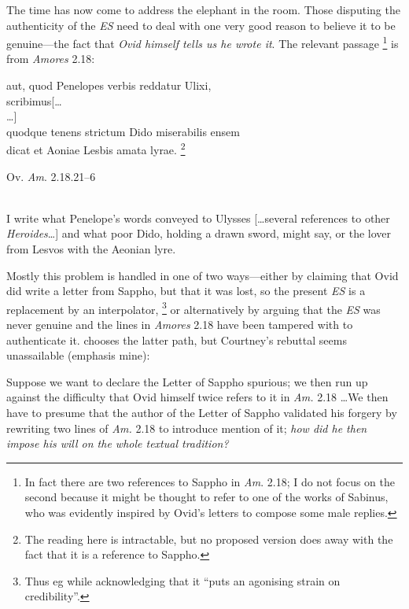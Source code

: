 \documentclass[twocolumn, switch, a4paper]{article} %
\begin{document}
The time has now come to address the elephant in the room. Those disputing the
authenticity of the \emph{ES} need to deal with one very good reason to
believe it to be genuine---the fact that \emph{Ovid himself tells us he wrote
it}. The relevant passage%
%
    \footnote{In fact there are two references to Sappho in \emph{Am}. 2.18; I
    do not focus on the second because it might be thought to refer to one of
    the works of Sabinus, who was evidently inspired by Ovid's letters to
    compose some male replies.}
%
is from \emph{Amores} 2.18:
\begin{adjustwidth}{0.07\linewidth}{0.07\linewidth}
  \footnotesize
  \smallskip
  \begin{onehalfspace}
    aut, quod Penelopes verbis reddatur Ulixi,\\
    \phantom{xx} scribimus[\dots\\
    \dots]\\
    quodque tenens strictum Dido miserabilis ensem\\
    \phantom{xx} dicat et \dag Aoniae Lesbis amata lyrae\dag.%
    \footnote{The reading here is intractable, but no proposed version does
    away with the fact that it is a reference to Sappho.}
    \begin{flushright}
      Ov. \emph{Am}. 2.18.21--6
    \end{flushright}
  \end{onehalfspace}
  \phantom{xx}\\
  I write what Penelope's words conveyed to Ulysses [\dots several
  references to other \emph{Heroides}\dots] and what poor Dido, holding
  a drawn sword, might say, or the lover from Lesvos with the Aeonian lyre.
\end{adjustwidth}
Mostly this problem is handled in one of two ways---either by claiming that
Ovid did write a letter from Sappho, but that it was lost, so the present
\emph{ES} is a replacement by an interpolator,%
%
    \footnote{Thus eg  while acknowledging that it
    ``puts an agonising strain on credibility''.}
%
or alternatively by arguing that the \emph{ES} was never genuine and the lines
in \emph{Amores} 2.18 have been tampered with to authenticate it.
 chooses the latter path, but Courtney's
\citeyear[163]{courtney_97} rebuttal seems unassailable (emphasis mine):

\begin{adjustwidth}{0.07\linewidth}{0.07\linewidth}
\footnotesize%
 Suppose we want to declare the Letter of Sappho spurious; we then run up
 against the difficulty that Ovid himself twice refers to it in \emph{Am.} 2.18
 \dots We then have to presume that the author of the Letter of Sappho
 validated his forgery by rewriting two lines of \emph{Am.} 2.18 to introduce
 mention of it; \emph{how did he then impose his will on the whole textual
 tradition?}
\end{adjustwidth}
\end{document}
